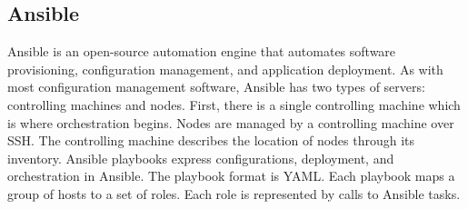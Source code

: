 \subsection{Ansible} \label{lang:ansible}
Ansible is an open-source automation engine that automates software provisioning, configuration management, and application deployment.
As with most configuration management software, Ansible has two types of servers: controlling machines and nodes.
First, there is a single controlling machine which is where orchestration begins.
Nodes are managed by a controlling machine over SSH.
The controlling machine describes the location of nodes through its inventory.
Ansible playbooks express configurations, deployment, and orchestration in Ansible.
The playbook format is YAML. 
Each playbook maps a group of hosts to a set of roles.
Each role is represented by calls to Ansible tasks.
 \cite{ansible} 
